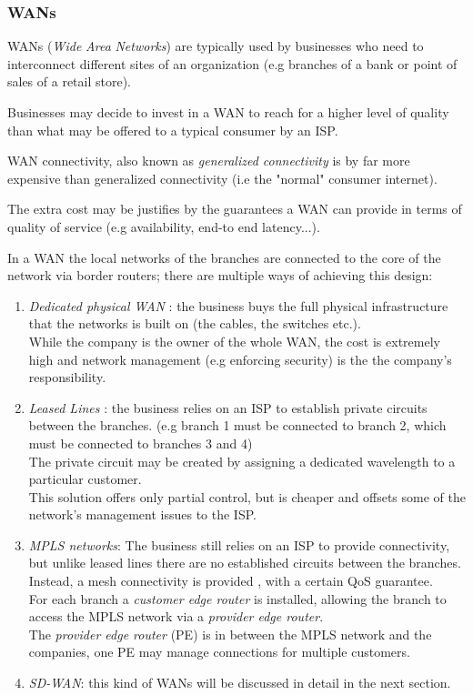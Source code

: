 \documentclass{article}
\begin{document}
  \subsubsection{WANs}
  WANs (\textit{Wide} \textit{Area} \textit{Networks}) are typically used by businesses who need to interconnect different sites of an organization (e.g branches of a bank or point of sales of a retail store).

  Businesses may decide to invest in a WAN to reach for a higher level of quality than what may be offered to a typical consumer by an ISP.
   
  WAN connectivity, also known as \textit{generalized connectivity} is by far more expensive than generalized connectivity (i.e the "normal" consumer internet).
  
   The extra cost may be justifies by the guarantees a WAN can provide in terms of quality of service (e.g availability, end-to end latency...).
   
   In a WAN the local networks of the branches are connected to the core of the network via border routers; there are multiple ways of achieving this design:
   
   \begin{enumerate}
   	\item \textit{Dedicated physical WAN} : the business buys the full physical infrastructure that the networks is built on (the cables, the switches etc.). \\ While the company is the owner of the whole WAN, the cost is extremely high and network management (e.g enforcing security) is the the company's responsibility.
   	
   	\item \textit{Leased Lines} : the business relies on an ISP to establish private circuits between the branches. (e.g branch 1 must be connected to branch 2, which must be connected to branches 3 and 4) \\
   	The private circuit may be created by assigning  a dedicated wavelength to a particular customer. \\
   	This solution offers only partial control, but is cheaper and offsets some of the network's management issues to the ISP.
   	
   	\item \textit{MPLS networks}: The business still relies on an ISP to provide connectivity, but unlike leased lines there are no established circuits between the branches.  Instead, a mesh connectivity is provided , with a certain QoS guarantee. \\
   	For each branch a \textit{customer edge router} is installed, allowing the branch to access the MPLS network via a \textit{provider edge router}. \\
   	The \textit{provider edge router} (PE) is in between the MPLS network and the companies, one PE may manage connections for multiple customers.
   	
   	\item \textit{SD-WAN}: this kind of WANs will be discussed in detail in the next section.
   	
   \end{enumerate} 
\end{document}
